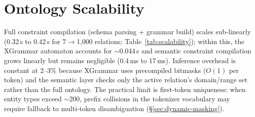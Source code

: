 \section{Ontology Scalability}
\label{app:scalability}

\begin{table}[h]
\centering
\small
{}
\caption{Compilation time (one-time) and per-token inference overhead across ontology scales. Small and Medium use real ontologies; Large and XLarge use synthetic ontologies with random domain/range constraints. Overhead measured on Qwen3-8B, 10 documents per scale.}
\label{tab:scalability}
\end{table}

Full constraint compilation (schema parsing + grammar build) scales sub-linearly (0.32\,s to 0.42\,s for 7$\to$1{,}000 relations; Table~\ref{tab:scalability}); within this, the XGrammar automaton accounts for $\sim$0.044\,s and semantic constraint compilation grows linearly but remains negligible (0.4\,ms to 17\,ms).
Inference overhead is constant at 2--3\% because XGrammar uses precompiled bitmasks ($O(1)$ per token) and the semantic layer checks only the active relation's domain/range set rather than the full ontology.
The practical limit is first-token uniqueness: when entity types exceed $\sim$200, prefix collisions in the tokenizer vocabulary may require fallback to multi-token disambiguation (\S\ref{sec:dynamic-masking}).
